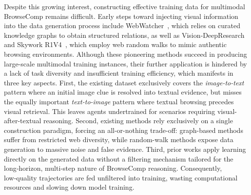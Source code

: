 \documentclass[11pt]{article}
\begin{document}
Despite this growing interest, constructing effective training data for multimodal BrowseComp remains difficult.
Early steps toward injecting visual information into the data generation process include WebWatcher~\citep{geng2025webwatcher}, which relies on curated knowledge graphs to obtain structured relations, as well as Vision‑DeepResearch~\citep{zeng2026vision} and Skywork R1V4~\citep{zhang2025skywork}, which employ web random walks to mimic authentic browsing environments. Although these pioneering methods succeed in producing large-scale multimodal training instances, their further application is hindered by a lack of task diversity and insufficient training efficiency, which manifests in three key aspects.
First, the existing dataset exclusively covers the \emph{image-to-text} pattern where an initial image clue is resolved into textual evidence, but misses the equally important \emph{text-to-image} pattern where textual browsing precedes visual retrieval. This leaves agents undertrained for scenarios requiring visual-after-textual reasoning. 
Second, %
existing methods rely exclusively on a single construction paradigm, forcing an all-or-nothing trade-off: graph-based methods suffer from restricted web diversity, while random-walk methods expose data generation to massive noise and false evidence. 
Third, %
prior works apply learning directly on the generated data without a filtering mechanism tailored for the long‑horizon, multi‑step nature of BrowseComp reasoning. Consequently, low‑quality trajectories are fed unfiltered into training, wasting computational resources and slowing down model training.
\end{document}
